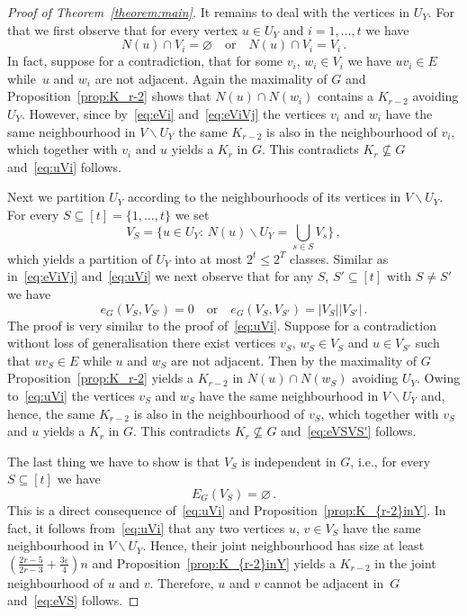 \documentclass[reqno, 12pt]{amsart}
\theoremstyle{plain}
\theoremstyle{definition}
\let\eps=\varepsilon
\let\setminus=\smallsetminus
\let\emptyset=\varnothing
\begin{document}
\begin{proof}[Proof of Theorem~\ref{theorem:main}]
	It remains to deal with the vertices in $U_Y$. For that we first observe that for every vertex 
	$u\in U_Y$	and $i=1,\dots,t$ we have 
	\begin{equation}\label{eq:uVi} 
		N(u)\cap V_i=\emptyset\quad \text{or}\quad N(u)\cap V_i=V_i\,.
	\end{equation}
	In fact, suppose for a contradiction, that for some $v_i$, $w_i\in V_i$ we have 
	$uv_i\in E$ while~$u$ and $w_i$ are not adjacent. Again the maximality of $G$
	and Proposition~\ref{prop:K_r-2} shows that $N(u)\cap N(w_i)$ contains a $K_{r-2}$
	avoiding $U_Y$. However, since by~\eqref{eq:eVi} and~\eqref{eq:eViVj} the vertices $v_i$ and $w_i$ 
	have the same neighbourhood in $V\setminus U_Y$ the same $K_{r-2}$ is also in the 
	neighbourhood of $v_i$, which together with $v_i$ and $u$ yields a $K_r$ in $G$.
	This contradicts $K_r\not\subseteq G$ and~\eqref{eq:uVi} follows.
	
	Next we partition $U_Y$ according to the neighbourhoods of its vertices in $V\setminus U_Y$.
	For every $S\subseteq [t]=\{1,\dots,t\}$ we set
	\[
		V_S=\bigg\{u\in U_Y{\colon\,} N(u)\setminus U_Y=\bigcup_{s\in S}V_s\bigg\}\,,
	\]
	which yields a partition of $U_Y$ into at most $2^t\leq 2^T$
	classes. Similar as in~\eqref{eq:eViVj} and~\eqref{eq:uVi} we next observe that for any $S$, 
	$S'\subseteq [t]$  with $S\neq S'$ we have 
	\begin{equation}\label{eq:eVSVS'}
		e_G(V_S,V_{S'})=0\quad \text{or}\quad e_G(V_S,V_{S'})=|V_S||V_{S'}|\,.
	\end{equation}
	The proof is very similar to the proof of~\eqref{eq:uVi}.
	Suppose for a contradiction without loss of generalisation there exist 
	vertices $v_S$, $w_S\in V_S$ and $u\in V_{S'}$ such that
	$uv_S\in E$ while $u$ and $w_S$ are not adjacent. Then by the maximality of $G$
	Proposition~\ref{prop:K_r-2} yields a  $K_{r-2}$ in $N(u)\cap N(w_S)$
	avoiding $U_Y$. Owing to~\eqref{eq:uVi} the vertices $v_S$ and $w_S$ 
	have the same neighbourhood in $V\setminus U_Y$ and, hence, the same $K_{r-2}$ 
	is also in the neighbourhood of $v_S$, which together with $v_S$ and $u$ yields a $K_r$ in $G$.
	This contradicts $K_r\not\subseteq G$ and~\eqref{eq:eVSVS'} follows.
	
	The last thing we have to show is that $V_S$ is independent in $G$, i.e., for every $S\subseteq [t]$ we
	have 
	\begin{equation}\label{eq:eVS}
		E_G(V_S)=\emptyset\,.
	\end{equation}
	This is a direct consequence of~\eqref{eq:uVi} and Proposition~\ref{prop:K_{r-2}inY}.
	In fact, it follows from~\eqref{eq:uVi} that any two vertices $u$, $v\in V_S$ 
	have the same neighbourhood in $V\setminus U_Y$. Hence, their joint neighbourhood 
	has size at least $(\frac{2r-5}{2r-3}+\frac{3\eps}{4})n$ and Proposition~\ref{prop:K_{r-2}inY}
	yields a $K_{r-2}$ in the joint neighbourhood of $u$ and $v$. Therefore, $u$ and $v$ cannot be
	adjacent in~$G$ and~\eqref{eq:eVS} follows.
	

\end{proof}
\end{document}
